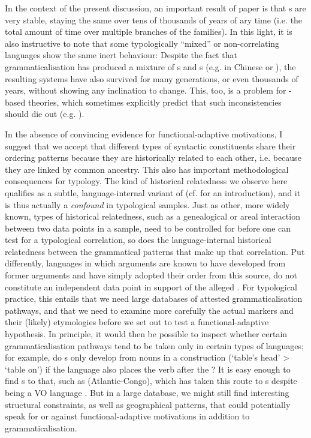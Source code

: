 \documentclass[output=paper]{langsci/langscibook}
\begin{document}
\newpage 
In the context of the present discussion, an important result of  paper is that s are very stable, staying the same over tens of thousands of years of ary time (i.e. the total amount of time over multiple branches of the families). In this light, it is also instructive to note that some typologically “mixed” or non-correlating languages show the same inert behaviour: Despite the fact that grammaticalisation has produced a mixture of s and s (e.g. in Chinese or ), the resulting systems have also survived for many generations, or even thousands of years, without showing any inclination to change. This, too, is a problem for -based theories, which sometimes explicitly predict that such inconsistencies should die out (e.g. \citealt{KirbyHurford1997}).

In the absence of convincing evidence for functional-adaptive motivations, I suggest that we accept that different types of syntactic constituents share their ordering patterns because they are historically related to each other, i.e. because they are linked by common ancestry. This also has important methodological consequences for typology. The kind of historical relatedness we observe here \label{pg:collins:dependency}qualifies as a subtle, language-internal variant of  (cf. \citealt{Cysouw2011} for an introduction), and it is thus actually a \textit{confound} in typological samples. Just as other, more widely known, types of historical relatedness, such as a genealogical or areal interaction between two data points in a sample, need to be controlled for before one can test for a typological correlation, so does the language-internal historical relatedness between the grammatical patterns that make up that correlation. Put differently, languages in which  arguments are known to have developed from former  arguments and have simply adopted their order from this source, do not constitute an independent data point in support of the alleged . For typological practice, this entails that we need large databases
\label{pg:collins:refforhaspelmath}of attested grammaticalisation pathways, and that we need to examine more carefully the actual markers and their (likely) etymologies before we set out to test a functional-adaptive hypothesis. In principle, it would then be possible to inspect whether certain grammaticalisation pathways tend to be taken only in certain types of languages; for example, do s only develop from nouns in a  construction (‘table's head’ > ‘table on’) if the language also places the verb after the ? It is easy enough to find s to that, such as  (Atlantic-Congo), which has taken this route to s despite being a VO language \citep{Bodomo1997}. But in a large database, we might still find interesting structural constraints, as well as geographical patterns, that could potentially speak for or against functional-adaptive motivations in addition to grammaticalisation. 
\end{document}
